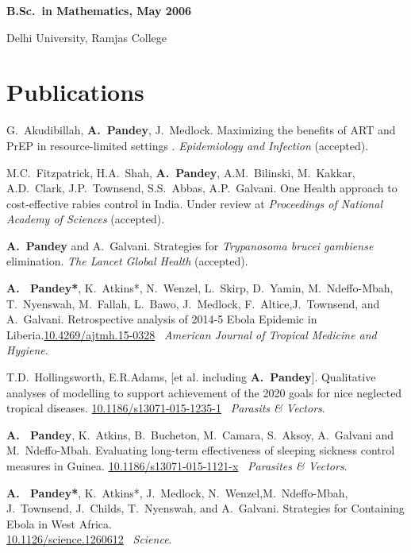 \documentclass[margin,line,pifont,palatino,courier]{res}
\newcommand\doilink[1]{\href{http://dx.doi.org/#1}{#1}}
\newenvironment{list1}{
  \begin{list}{\ding{113}}{%
      \setlength{\itemsep}{0in}
      \setlength{\parsep}{0in} \setlength{\parskip}{0in}
      \setlength{\topsep}{0in} \setlength{\partopsep}{0in}
      \setlength{\leftmargin}{0.17in}}}{\end{list}}
\begin{document}
\begin{resume}
{\bf B.Sc.~in  Mathematics, May 2006}\\
\vspace*{-.1in}
\begin{list1}
\item[] Delhi University, Ramjas College
\end{list1}






\section{\sc Publications}
G.~Akudibillah, \textbf{A.~Pandey}, J.~Medlock. {Maximizing the benefits of ART and PrEP in resource-limited settings
}. \textit{Epidemiology and Infection} (accepted).


M.C.~Fitzpatrick, H.A.~Shah, \textbf{A.~Pandey}, A.M.~Bilinski,
M.~Kakkar, A.D.~Clark, J.P.~Townsend, S.S.~Abbas, A.P.~Galvani. {One
  Health approach to cost-effective rabies control in India}. Under
review at \textit{Proceedings of National Academy of Sciences} (accepted).


\textbf{A.~Pandey} and A.~Galvani. {Strategies for \textit{Trypanosoma
  brucei gambiense} elimination}. \textit{The Lancet Global Health} (accepted).

\textbf{A. ~Pandey*}, K.~Atkins*, N.~Wenzel, L.~Skirp, D.~Yamin,
M.~Ndeffo-Mbah, T.~Nyenswah, M.~Fallah, L.~Bawo, J.~Medlock,
F.~Altice,J.~Townsend,  and A.~Galvani. {Retrospective analysis of
2014-5 Ebola Epidemic in Liberia}.\doilink{10.4269/ajtmh.15-0328}
~\textit{American Journal of Tropical Medicine and Hygiene}.

T.D.~Hollingsworth, E.R.Adams, [et al. including
\textbf{A.~Pandey}]. {Qualitative analyses of modelling to support
  achievement of the 2020 goals for nice neglected tropical
  diseases}. \doilink{10.1186/s13071-015-1235-1} ~\textit{Parasits \& Vectors}.

\textbf{A. ~Pandey}, K.~Atkins, B.~Bucheton, M.~Camara, S.~Aksoy, A.~Galvani
and M.~Ndeffo-Mbah. {Evaluating long-term effectiveness of sleeping
  sickness control measures in Guinea}. \doilink{10.1186/s13071-015-1121-x} ~\textit{Parasites \& Vectors}.

\textbf{A. ~Pandey*}, K.~Atkins*, J.~Medlock, N.~Wenzel,M.~Ndeffo-Mbah,
J.~Townsend, J.~Childs, T.~Nyenswah, and A.~Galvani. {Strategies
  for Containing Ebola in West Africa}. \\
\doilink{10.1126/science.1260612} ~\textit{Science}.


\end{resume}
\end{document}
